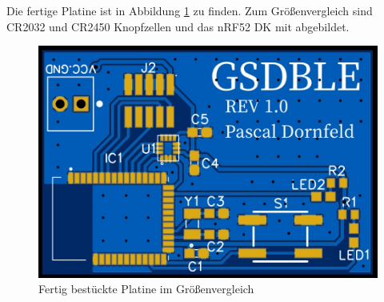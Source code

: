 Die fertige Platine ist in Abbildung \ref{fig:platine} zu finden.
Zum Größenvergleich sind CR2032 und CR2450 Knopfzellen und das nRF52 DK mit abgebildet.
\begin{figure}[hbt]
	\centering
	\includegraphics[width=0.5\linewidth]{res/platine.jpg}
	\caption{Fertig bestückte Platine im Größenvergleich}
	\label{fig:platine}
\end{figure}\\


